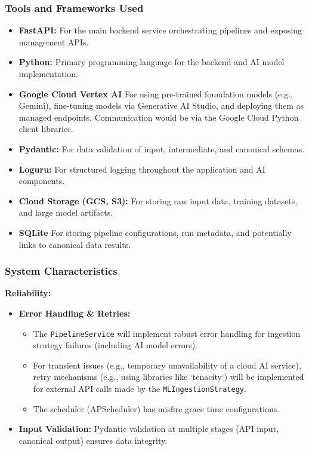 \subsubsection{Tools and Frameworks Used}
\begin{itemize}
    \item \textbf{FastAPI:} For the main backend service orchestrating pipelines and exposing management APIs.
    \item \textbf{Python:} Primary programming language for the backend and AI model implementation.
    \item \textbf{Google Cloud Vertex AI} For using pre-trained foundation models (e.g., Gemini), fine-tuning models via Generative AI Studio, and deploying them as managed endpoints. Communication would be via the Google Cloud Python client libraries.
    \item \textbf{Pydantic:} For data validation of input, intermediate, and canonical schemas.
    \item \textbf{Loguru:} For structured logging throughout the application and AI components.
    \item \textbf{Cloud Storage (GCS, S3):} For storing raw input data, training datasets, and large model artifacts.
    \item \textbf{SQLite} For storing pipeline configurations, run metadata, and potentially links to canonical data results.
\end{itemize}

\subsubsection{System Characteristics}
\textbf{Reliability:}
\begin{itemize}
    \item \textbf{Error Handling \& Retries:}
        \begin{itemize}
            \item The \texttt{PipelineService} will implement robust error handling for ingestion strategy failures (including AI model errors).
            \item For transient issues (e.g., temporary unavailability of a cloud AI service), retry mechanisms (e.g., using libraries like `tenacity`) will be implemented for external API calls made by the \texttt{MLIngestionStrategy}.
            \item The scheduler (APScheduler) has misfire grace time configurations.
        \end{itemize}
    \item \textbf{Input Validation:} Pydantic validation at multiple stages (API input, canonical output) ensures data integrity.
\end{itemize}


